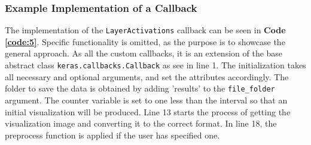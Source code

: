 
\subsubsection{Example Implementation of a Callback}

The implementation of the \texttt{LayerActivations} callback can be seen in \textbf{Code \ref{code:5}}. Specific functionality is omitted, as the purpose is to showcase the general approach. As all the custom callbacks, it is an extension of the base abstract class \texttt{keras.callbacks.Callback} as see in line 1. The initialization takes all necessary and optional arguments, and set the attributes accordingly. The folder to save the data is obtained by adding 'results' to the \texttt{file\_folder} argument. The counter variable is set to one less than the interval so that an initial visualization will be produced. Line 13 starts the process of getting the visualization image and converting it to the correct format. In line 18, the preprocess function is applied if the user has specified one. \\

